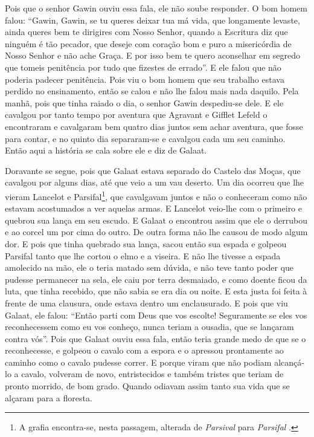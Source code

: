 Pois que o senhor Gawin ouviu essa fala, ele não soube responder. O bom homem
falou: ``Gawin, Gawin, se tu queres deixar tua má vida, que longamente levaste,
ainda queres bem te dirigires com Nosso Senhor, quando a Escritura diz que
ninguém é tão pecador, que deseje com coração bom e puro a misericórdia de
Nosso Senhor e não ache Graça. E por isso bem te quero aconselhar em segredo
que tomeis penitência por tudo que fizestes de errado”. E ele falou que não
poderia padecer penitência. Pois viu o bom homem que seu trabalho estava
perdido no ensinamento, então se calou e não lhe falou mais nada daquilo. Pela
manhã, pois que tinha raiado o dia, o senhor Gawin despediu-se dele. E ele
cavalgou por tanto tempo por aventura que Agravant e Gifflet Lefeld o
encontraram e cavalgaram bem quatro dias juntos sem achar aventura, que fosse
para contar, e no quinto dia separaram-se e cavalgou cada um seu caminho. Então
aqui a história se cala sobre ele e diz de Galaat.

Doravante se segue, pois que Galaat estava separado do Castelo das Moças, que
cavalgou por alguns dias, até que veio a um vau deserto. Um dia ocorreu que lhe
vieram Lancelot e Parsifal\footnote{ A grafia encontra-se, nesta passagem,
alterada de \textit{Parsival} para \textit{Parsifal }.},  que
cavalgavam juntos e não o conheceram como não estavam acostumados a ver aquelas
armas. E Lancelot veio-lhe com o primeiro e quebrou sua lança em seu escudo. E
Galaat o encontrou assim que ele o derrubou e ao corcel um por cima do outro.
De outra forma não lhe causou de modo algum dor. E pois que tinha quebrado sua
lança, sacou então sua espada e golpeou Parsifal tanto que lhe cortou o elmo e
a viseira. E não lhe tivesse a espada amolecido na mão, ele o teria matado sem
dúvida, e não teve tanto poder que pudesse permanecer na sela, ele caiu por
terra desmaiado, e como doente ficou da luta, que tinha recebido, que não sabia
se era dia ou noite. E esta justa foi feita à frente de uma clausura, onde
estava dentro um enclausurado. E pois que viu Galaat, ele falou: “Então parti
com Deus que vos escolte! Seguramente se eles vos reconhecessem como eu vos
conheço, nunca teriam a ousadia, que se lançaram contra vós”. Pois que Galaat
ouviu essa fala, então teria grande medo de que se o reconhecesse, e golpeou o
cavalo com a espora e o apressou prontamente ao caminho como o cavalo pudesse
correr. E porque viram que não podiam alcançá-lo a cavalo, volveram de novo,
entristecidos e também tristes que teriam de pronto morrido, de bom grado.
Quando odiavam assim tanto sua vida que se alçaram para a floresta.

